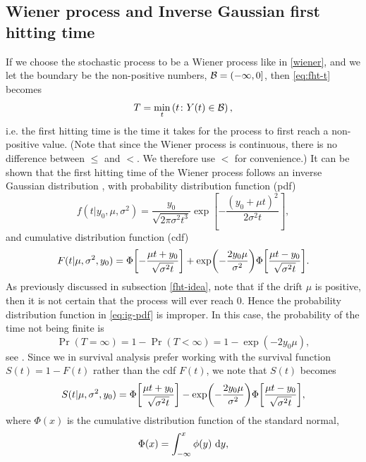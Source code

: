 \subsection{Wiener process and Inverse Gaussian first hitting time}
If we choose the stochastic process to be a Wiener process like in \eqref{wiener}, and we let the boundary be the non-positive numbers, $\mathcal{B}=(-\infty,0]$, then \eqref{eq:fht-t} becomes
\begin{equation}
    T=\min_t\left(t\colon Y(t)\in\mathcal{B}\right),
\end{equation}
i.e. the first hitting time is the time it takes for the process to first reach a non-positive value.
(Note that since the Wiener process is continuous, there is no difference between $\leq$ and $<$. We therefore use $<$ for convenience.)
It can be shown that the first hitting time of the Wiener process follows an inverse Gaussian distribution \citep{chhikara1988}, with probability distribution function (pdf)
\begin{equation}
\label{eq:ig-pdf}
    f(t|y_0,\mu,\sigma^2)=\frac{y_0}{\sqrt{2\pi\sigma^2t^3}}\exp\left[-\frac{(y_0+\mu t)^2}{2\sigma^2t}\right],
\end{equation}
and cumulative distribution function (cdf)
\begin{equation}
\label{eq:ig-cdf}
    F(t|\mu,\sigma^2,y_0)=\Phi\sqb*{-\frac{\mu t+y_0}{\sqrt{\sigma^2t}}}+\exp\p*{-\frac{2y_0\mu}{\sigma^2}}\Phi\sqb*{\frac{\mu t-y_0}{\sqrt{\sigma^2t}}}.
\end{equation}
As previously discussed in subsection \ref{fht-idea}, note that if the drift $\mu$ is positive, then it is not certain that the process will ever reach 0. Hence the probability distribution function in \eqref{eq:ig-pdf} is improper. In this case, the probability of the time not being finite is
\begin{equation}\label{eq:P-inf-FHT}
    \Pr{(T=\infty)}=1-\Pr{(T<\infty)}=1-\exp{(-2y_0\mu)},
\end{equation}
see \citet{cox1965}. Since we in survival analysis prefer working with the survival function $S(t)=1-F(t)$ rather than the cdf $F(t)$, we note that $S(t)$ becomes
\begin{equation}
\label{eq:ig-surv}
    S(t|\mu,\sigma^2,y_0)=\Phi\sqb*{\frac{\mu t+y_0}{\sqrt{\sigma^2t}}}-\exp\p*{-\frac{2y_0\mu}{\sigma^2}}\Phi\sqb*{\frac{\mu t-y_0}{\sqrt{\sigma^2t}}},
\end{equation}
where $\Phi(x)$ is the cumulative distribution function of the standard normal,
\begin{equation*}
    \Phi(x)=\int_{-\infty}^x\phi(y)\text{~d}y,
\end{equation*}
